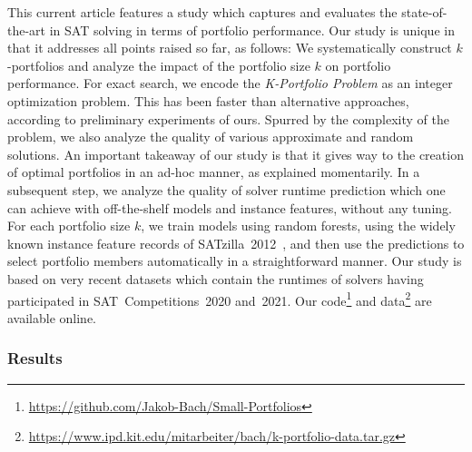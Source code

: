 \documentclass[conference]{IEEEtran}
\begin{document}
This current article features a study which captures and evaluates the state-of-the-art in SAT solving in terms of portfolio performance. 
Our study is unique in that it addresses all points raised so far, as follows:
We systematically construct $k$-portfolios and analyze the impact of the portfolio size $k$ on portfolio performance. 
For exact search, we encode the \emph{K-Portfolio Problem} as an integer optimization problem. 
This has been faster than alternative approaches, according to preliminary experiments of ours. 
Spurred by the complexity of the problem, we also analyze the quality of various approximate and random solutions. 
An important takeaway of our study is that it gives way to the creation of optimal portfolios in an ad-hoc manner, as explained momentarily. 
In a subsequent step, we analyze the quality of solver runtime prediction which one can achieve with off-the-shelf models and instance features, without any tuning.
For each portfolio size $k$, we train models using random forests, using the widely known instance feature records of SATzilla~2012~\cite{xu2012satzilla2012}, and then use the predictions to select portfolio members automatically in a straightforward manner. 
Our study is based on very recent datasets which contain the runtimes of solvers having participated in SAT~Competitions~2020 and~2021. 
Our code\footnote{\url{https://github.com/Jakob-Bach/Small-Portfolios}} and data\footnote{\url{https://www.ipd.kit.edu/mitarbeiter/bach/k-portfolio-data.tar.gz}} are available online.

\subsubsection{Results}
\end{document}
